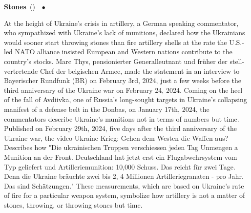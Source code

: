 \documentclass[10pt,a4paper,twoside]{article} %
\newcommand{\entry}[4]{\markboth{#1}{#1}\textbf{#1}\ {(#2)}\ \textit{#3}\ $\bullet$\ {#4}}  %
\begin{document}
\begin{multicols}{2}
\entry{Stones} {} {} {At the height of Ukraine's crisis in artillery, a German speaking commentator, who sympathized with Ukraine's lack of munitions, declared how the Ukrainians would sooner start throwing stones than fire artillery shells at the rate the U.S.-led NATO alliance insisted European and Western nations contribute to the country's stocks.  Marc Thys, \textgerman{pensionierter Generalleutnant und früher der stellvertretende Chef der belgischen Armee}, made the statement in an interview to Bayerischer Rundfunk (BR) on February 3rd, 2024, just a few weeks before the third anniversary of the Ukraine war on February 24, 2024. \newline \indent Coming on the heel of the fall of Avdiivka, one of Russia's long-sought targets in Ukraine's collapsing manifest of a defense belt in the Donbas, on January 17th, 2024, the commentators describe Ukraine's munitions not in terms of numbers but time. Published on February 29th, 2024, five days after the third anniversary of the Ukraine war, the video Ukraine-Krieg: Gehen dem Westen die Waffen aus? Describes how "\textgerman{Die ukrainischen Truppen verschiessen jeden Tag Unmengen a Munition an der Front. Deutschland hat jetzt erst ein Flugabwehrsystem vom Typ geliefert und Artilleriemunition: 10,000 Schuss. Das reicht für zwei Tage. Denn die Ukraine bräuchte zwei bis 2, 4 Millionen Artilleriegranaten - pro Jahr. Das sind Schätzungen}." These measurements, which are based on Ukraine's rate of fire for a particular weapon system, symbolize how artillery is not a matter of stones, throwing, or throwing stones but time. 

}



\end{multicols}
\end{document}
